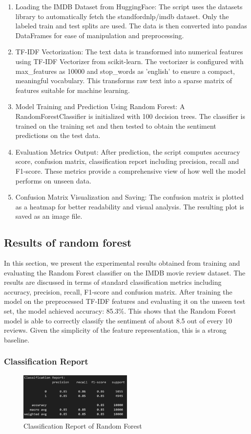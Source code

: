 \begin{enumerate}
    \item Loading the IMDB Dataset from HuggingFace: The script uses the datasets library to automatically fetch the standfordnlp/imdb dataset. Only the labeled train and test splits are used. The data is then converted into pandas DataFrames for ease of manipulation and preprocessing.
    \item TF-IDF Vectorization: The text data is transformed into numerical features using TF-IDF Vectorizer from scikit-learn. The vectorizer is configured with max\_features as 10000 and stop\_words as 'english' to ensure a compact, meaningful vocabulary. This transforms raw text into a sparse matrix of features suitable for machine learning.
    \item Model Training and Prediction Using Random Forest: A RandomForestClassifier is initialized with 100 decision trees. The classifier is trained on the training set and then tested to obtain the sentiment predictions on the test data.
    \item Evaluation Metrics Output: After prediction, the script computes accuracy score, confusion matrix, classification report including precision, recall and F1-score. These metrics provide a comprehensive view of how well the model performs on unseen data.
    \item Confusion Matrix Visualization and Saving: The confusion matrix is plotted as a heatmap for better readability and visual analysis. The resulting plot is saved as an image file.
\end{enumerate}


\subsection{Results of random forest}
In this section, we present the experimental results obtained from training and evaluating the Random Forest classifier on the IMDB movie review dataset. The results are discussed in terms of standard classification metrics including accuracy, precision, recall, F1-score and confusion matrix.
After training the model on the preprocessed TF-IDF features and evaluating it on the unseen test set, the model achieved accuracy: 85.3\%. This shows that the Random Forest model is able to correctly classify the sentiment of about 8.5 out of every 10 reviews. Given the simplicity of the feature representation, this is a strong baseline.

\subsubsection*{Classification Report}
\begin{figure}[ht]
    \centering
    \includegraphics[width=0.5\textwidth]{pics/rf_eval_report.png}
    \caption{Classification Report of Random Forest}
\end{figure}

